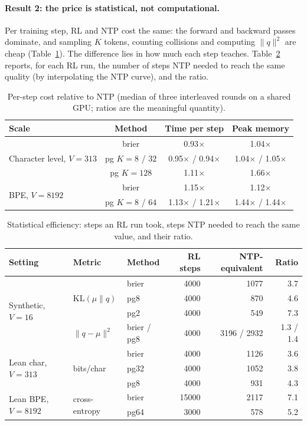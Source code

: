 \documentclass[11pt]{article}
\theoremstyle{definition}
\newcommand{\KL}{\mathrm{KL}}
\begin{document}
\paragraph{Result 2: the price is statistical, not computational.} Per training step, RL and NTP cost the same: the forward and backward passes dominate, and sampling $K$ tokens, counting collisions and computing $\|q\|^2$ are cheap (Table~\ref{tab:cost}). The difference lies in how much each step teaches. Table~\ref{tab:eff} reports, for each RL run, the number of steps NTP needed to reach the same quality (by interpolating the NTP curve), and the ratio.

\begin{table}[t]
\centering
\caption{Per-step cost relative to NTP (median of three interleaved rounds on a shared GPU; ratios are the meaningful quantity).}\label{tab:cost}
\small
\begin{tabular}{lccc}
\toprule
Scale & Method & Time per step & Peak memory \\
\midrule
\multirow{3}{*}{Character level, $V=313$} & \textsf{brier} & 0.93$\times$ & 1.04$\times$ \\
 & \textsf{pg} $K=8$ / $32$ & 0.95$\times$ / 0.94$\times$ & 1.04$\times$ / 1.05$\times$ \\
 & \textsf{pg} $K=128$ & 1.11$\times$ & 1.66$\times$ \\
\midrule
\multirow{2}{*}{BPE, $V=8192$} & \textsf{brier} & 1.15$\times$ & 1.12$\times$ \\
 & \textsf{pg} $K=8$ / $64$ & 1.13$\times$ / 1.21$\times$ & 1.44$\times$ / 1.44$\times$ \\
\bottomrule
\end{tabular}
\end{table}

\begin{table}[t]
\centering
\caption{Statistical efficiency: steps an RL run took, steps NTP needed to reach the same value, and their ratio.}\label{tab:eff}
\small
\begin{tabular}{lllrrr}
\toprule
Setting & Metric & Method & RL steps & NTP-equivalent & Ratio \\
\midrule
\multirow{4}{*}{Synthetic, $V=16$} & \multirow{3}{*}{$\KL(\mu\|q)$} & \textsf{brier} & 4000 & 1077 & 3.7 \\
 & & \textsf{pg8} & 4000 & 870 & 4.6 \\
 & & \textsf{pg2} & 4000 & 549 & 7.3 \\
 & $\|q-\mu\|^2$ & \textsf{brier} / \textsf{pg8} & 4000 & 3196 / 2932 & 1.3 / 1.4 \\
\midrule
\multirow{3}{*}{Lean char, $V=313$} & \multirow{3}{*}{bits/char} & \textsf{brier} & 4000 & 1126 & 3.6 \\
 & & \textsf{pg32} & 4000 & 1052 & 3.8 \\
 & & \textsf{pg8} & 4000 & 931 & 4.3 \\
\midrule
\multirow{2}{*}{Lean BPE, $V=8192$} & \multirow{2}{*}{cross-entropy} & \textsf{brier} & 15000 & 2117 & 7.1 \\
 & & \textsf{pg64} & 3000 & 578 & 5.2 \\
\bottomrule
\end{tabular}
\end{table}
\end{document}
